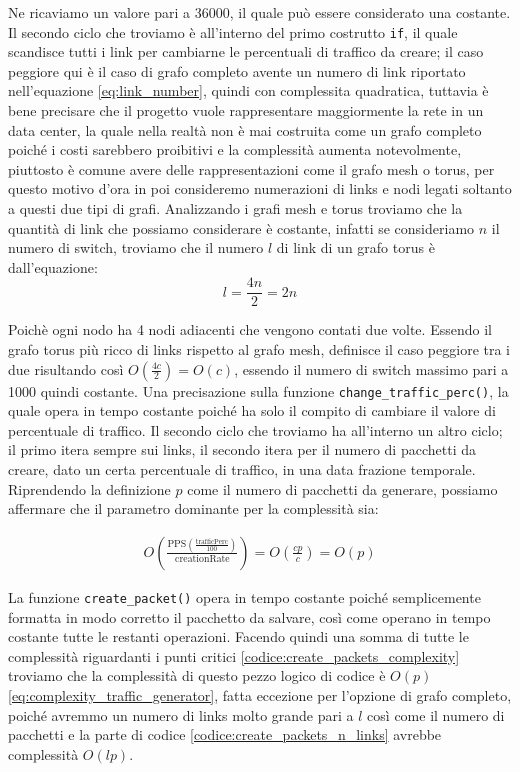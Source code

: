 \documentclass[binding=0.6cm]{sapthesis}
\begin{document}
Ne ricaviamo un valore pari a 36000, il quale può essere considerato una costante. Il secondo ciclo che troviamo è all'interno del primo costrutto \lstinline|if|, il quale scandisce tutti i link per cambiarne le percentuali di traffico da creare; il caso peggiore qui è il caso di grafo completo avente un numero di link
riportato nell'equazione \ref{eq:link_number}, quindi con complessita quadratica, tuttavia è bene precisare che il progetto vuole rappresentare maggiormente la rete in un data center, la quale nella realtà non è mai costruita come un grafo completo poiché i costi sarebbero proibitivi e la complessità aumenta notevolmente, piuttosto è comune avere delle 
rappresentazioni come il grafo mesh o torus, per questo motivo d'ora in poi consideremo numerazioni di links e nodi legati soltanto a questi due tipi di grafi. Analizzando i grafi mesh e torus troviamo che la quantità di link che possiamo considerare è costante, infatti
se consideriamo \(n\) il numero di switch, troviamo che il numero \(l\) di link di un grafo torus è dall'equazione:
\begin{equation}
    l = \frac{4n}{2} = 2n
    \label{eq:torus_link_number}
\end{equation}

Poichè ogni nodo ha 4 nodi adiacenti che vengono contati due volte. Essendo il grafo torus più ricco di links rispetto al grafo mesh, definisce il caso peggiore tra i due risultando così \(O(\frac{4c}{2}) = O(c)\), essendo il numero di switch massimo pari a 1000 quindi costante.
Una precisazione sulla funzione \lstinline|change_traffic_perc()|, la quale opera in tempo costante poiché ha solo il compito di cambiare il valore di percentuale di traffico.
Il secondo ciclo che troviamo ha all'interno un altro ciclo; il primo itera sempre sui links, il secondo itera per il numero di pacchetti da creare, dato un certa percentuale di traffico, in una data frazione temporale.
Riprendendo la definizione \(p\) come il numero di pacchetti da generare, possiamo affermare che il parametro dominante per la complessità sia:

\begin{align}
    O(\frac{\text{PPS}(\frac{\text{trafficPerc}}{100})}{\text{creationRate}}) = O(\frac{cp}{c}) = O(p)
    \label{eq:packets_per_fractional_time}
\end{align}

La funzione \lstinline|create_packet()| opera in tempo costante poiché semplicemente formatta in modo corretto il pacchetto da salvare, così come operano in tempo costante tutte le restanti operazioni.
Facendo quindi una somma di tutte le complessità riguardanti i punti critici \ref{codice:create_packets_complexity} 
troviamo che la complessità di questo pezzo logico di codice è \(O(p)\) \ref{eq:complexity_traffic_generator}, fatta eccezione per l'opzione di grafo completo, poiché avremmo un numero di
links molto grande pari a \(l\) così come il numero di pacchetti e la parte di codice \ref{codice:create_packets_n_links} avrebbe complessità \(O(lp)\).
\end{document}
